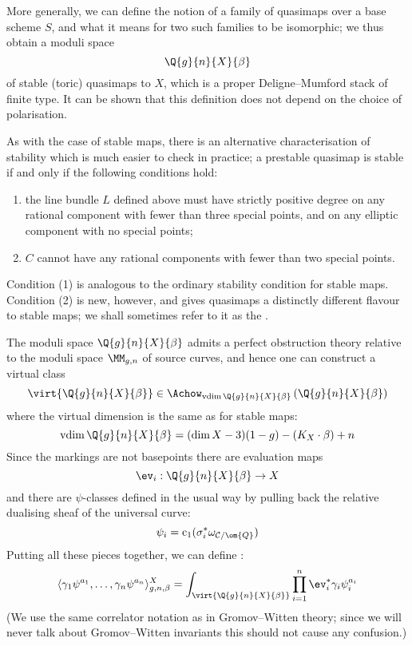 More generally, we can define the notion of a family of quasimaps over a base scheme $S$, and what it means for two such families to be isomorphic; we thus obtain a moduli space
\begin{equation*} \Q{g}{n}{X}{\beta} \end{equation*}
of stable (toric) quasimaps to $X$, which is a proper Deligne--Mumford stack of finite type. It can be shown that this definition does not depend on the choice of polarisation.


As with the case of stable maps, there is an alternative characterisation of stability which is much easier to check in practice; a prestable quasimap is stable if and only if the following conditions hold:
\begin{enumerate}
\item the line bundle $L$ defined above must have strictly positive degree on any rational component with fewer than three special points, and on any elliptic component with no special points;
\item $C$ cannot have any rational components with fewer than two special points.
\end{enumerate}
Condition (1) is analogous to the ordinary stability condition for stable maps. Condition (2) is new, however, and gives quasimaps a distinctly different flavour to stable maps; we shall sometimes refer to it as the .

The moduli space $\Q{g}{n}{X}{\beta}$ admits a perfect obstruction theory relative to the moduli space $\MM_{g,n}$ of source curves, and hence one can construct a virtual class
\begin{equation*} \virt{\Q{g}{n}{X}{\beta}} \in \Achow_{\operatorname{vdim}\Q{g}{n}{X}{\beta}} \left( \Q{g}{n}{X}{\beta} \right) \end{equation*}
where the virtual dimension is the same as for stable maps:
\begin{equation*} \operatorname{vdim}\Q{g}{n}{X}{\beta} = (\dim{X} - 3)(1-g) - (K_X \cdot \beta) + n \end{equation*}
Since the markings are not basepoints there are evaluation maps
\begin{equation*} \ev_i : \Q{g}{n}{X}{\beta} \to X \end{equation*}
and there are $\psi$-classes defined in the usual way by pulling back the relative dualising sheaf of the universal curve:
\begin{equation*} \psi_i = \operatorname{c}_1(\sigma_i^* \omega_{\mathcal{C}/\om{Q}}) \end{equation*}
Putting all these pieces together, we can define :
\begin{equation*} \langle \gamma_1 \psi^{a_1} , \ldots, \gamma_n \psi^{a_n} \rangle_{g,n,\beta}^X = \int_{\virt{\Q{g}{n}{X}{\beta}}} \prod_{i=1}^n \ev_i^* \gamma_i \psi_i^{a_i} \end{equation*}
(We use the same correlator notation as in Gromov--Witten theory; since we will never talk about Gromov--Witten invariants this should not cause any confusion.)

